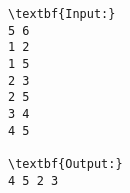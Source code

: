 \begin{verbatim}
\textbf{Input:}
5 6
1 2
1 5
2 3
2 5
3 4
4 5

\textbf{Output:}
4 5 2 3
\end{verbatim}